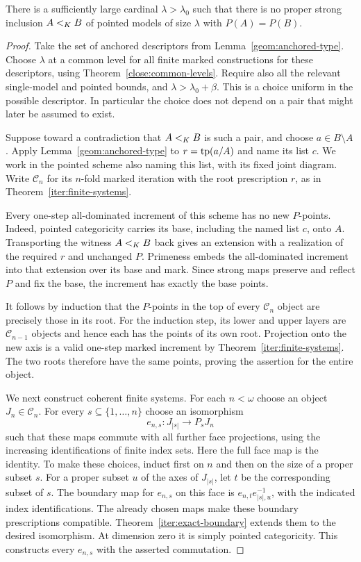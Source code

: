 \begin{theorem}
\label{geom:no-growth}
There is a sufficiently large cardinal $\lambda>\lambda_0$ such that
there is no proper strong inclusion $A<_K B$ of pointed models of
size $\lambda$ with $P(A)=P(B)$.
\end{theorem}

\begin{proof}
Take the set of anchored descriptors from
Lemma~\ref{geom:anchored-type}.  Choose $\lambda$ at a common level
for all finite marked constructions for these descriptors, using
Theorem~\ref{close:common-levels}.  Require also all the relevant
single-model and pointed bounds, and $\lambda>\lambda_0+\beta$.
This is a choice uniform in the possible descriptor.  In particular
the choice does not depend on a pair that might later be assumed to
exist.

Suppose toward a contradiction that $A<_K B$ is such a pair, and
choose $a\in B\setminus A$.  Apply
Lemma~\ref{geom:anchored-type} to $r=\operatorname{tp}(a/A)$ and name its list
$c$.  We work in the pointed scheme also naming this list, with its
fixed joint diagram.  Write $\mathcal C_n$ for its $n$-fold marked
iteration with the root prescription $r$, as in
Theorem~\ref{iter:finite-systems}.

Every one-step all-dominated increment of this scheme has no new
$P$-points.  Indeed, pointed categoricity carries its base, including
the named list $c$, onto $A$.  Transporting the witness $A<_K B$
back gives an extension with a realization of the required $r$ and
unchanged $P$.  Primeness embeds the all-dominated increment into
that extension over its base and mark.  Since strong maps preserve
and reflect $P$ and fix the base, the increment has exactly the base
points.

It follows by induction that the $P$-points in the top of every
$\mathcal C_n$ object are precisely those in its root.  For the
induction step, its lower and upper layers are $\mathcal C_{n-1}$
objects and hence each has the points of its own root.  Projection
onto the new axis is a valid one-step marked increment by
Theorem~\ref{iter:finite-systems}.  The two roots therefore have the
same points, proving the assertion for the entire object.

We next construct coherent finite systems.  For each $n<\omega$
choose an object $J_n\in\mathcal C_n$.  For every
$s\subseteq\{1,\dots,n\}$ choose an isomorphism
\[
e_{n,s}:J_{|s|}\longrightarrow P_sJ_n
\]
such that these maps commute with all further face projections, using
the increasing identifications of finite index sets.  Here the full
face map is the identity.  To make these choices, induct first on
$n$ and then on the size of a proper subset $s$.  For a proper subset
$u$ of the axes of $J_{|s|}$, let $t$ be the corresponding subset of
$s$.  The boundary map for $e_{n,s}$ on this face is
$e_{n,t}e_{|s|,u}^{-1}$, with the indicated index identifications.
The already chosen maps make these boundary prescriptions compatible.
Theorem~\ref{iter:exact-boundary} extends them to the desired
isomorphism.  At dimension zero it is simply pointed categoricity.
This constructs every $e_{n,s}$ with the asserted commutation.


\end{proof}
